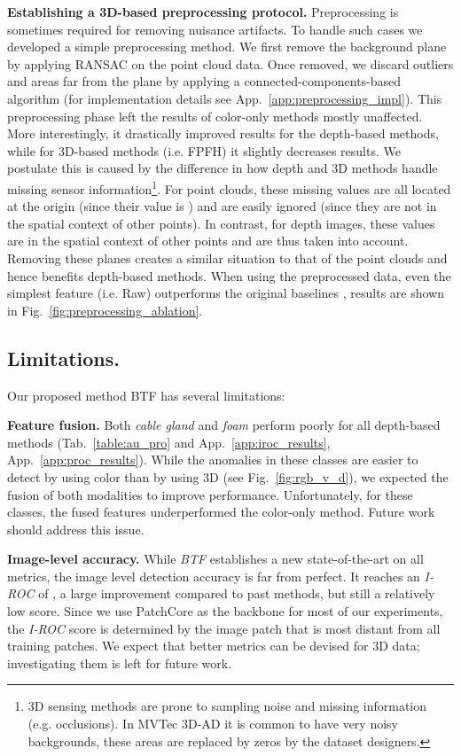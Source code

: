 \documentclass{article}
\begin{document}
\noindent \textbf{Establishing a 3D-based preprocessing protocol.} Preprocessing is sometimes required for removing nuisance artifacts. To handle such cases we developed a simple preprocessing method. We first remove the background plane by applying RANSAC \cite{ransac} on the point cloud data. Once removed, we discard outliers and areas far from the plane by applying a connected-components-based algorithm (for implementation details see App.~\ref{app:preprocessing_impl}).
This preprocessing phase left the results of color-only methods mostly unaffected. More interestingly, it drastically improved results for the depth-based methods, while for 3D-based methods (i.e. FPFH) it slightly decreases results. We postulate this is caused by the difference in how depth and 3D methods handle missing sensor information\footnote{3D sensing methods are prone to sampling noise and missing information (e.g. occlusions). In MVTec 3D-AD it is common to have very noisy backgrounds, these areas are replaced by zeros by the dataset designers.}. For point clouds, these missing values are all located at the origin (since their value is ) and are easily ignored (since they are not in the spatial context of other points). In contrast, for depth images, these values are in the spatial context of other points and are thus taken into account. Removing these planes creates a similar situation to that of the point clouds and hence benefits depth-based methods. When using the preprocessed data, even the simplest feature (i.e. Raw) outperforms the original baselines \cite{mvtec3d}, results are shown in Fig.~\ref{fig:preprocessing_ablation}.


\subsection{Limitations.} \noindent Our proposed method BTF has several limitations:

\noindent \textbf{Feature fusion.} Both \textit{cable gland} and \textit{foam} perform poorly for all depth-based methods (Tab.~\ref{table:au_pro} and App.~\ref{app:iroc_results}, App.~\ref{app:proc_results}). While the anomalies in these classes are easier to detect by using color than by using 3D (see Fig.~\ref{fig:rgb_v_d}), we expected the fusion of both modalities to improve performance. Unfortunately, for these classes, the fused features underperformed the color-only method. Future work should address this issue. 

\noindent  \textbf{Image-level accuracy.} While \textit{BTF} establishes a new state-of-the-art on all metrics, the image level detection accuracy is far from perfect. It reaches an \textit{I-ROC} of , a large improvement compared to past methods, but still a relatively low score. Since we use PatchCore as the backbone for most of our experiments, the \textit{I-ROC} score is determined by the image patch that is most distant from all training patches. We expect that better metrics can be devised for 3D data; investigating them is left for future work.
\end{document}
